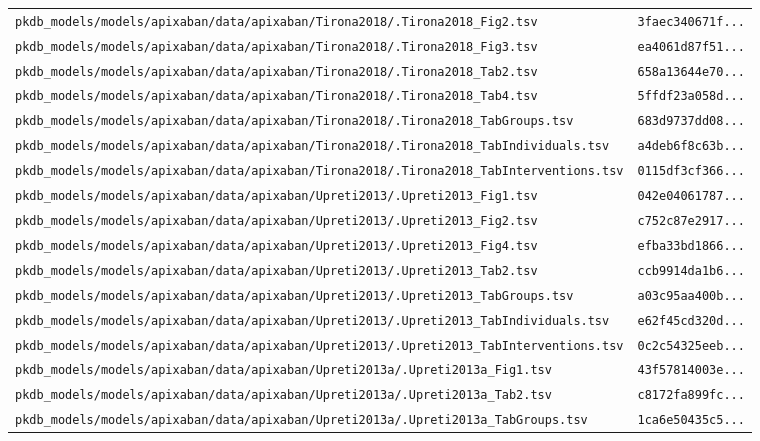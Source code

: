 \documentclass{article}
\begin{document}
\begin{longtable}{ll}
\texttt{pkdb\_models/models/apixaban/data/apixaban/Tirona2018/.Tirona2018\_Fig2.tsv} & \texttt{3faec340671f...} \\
\texttt{pkdb\_models/models/apixaban/data/apixaban/Tirona2018/.Tirona2018\_Fig3.tsv} & \texttt{ea4061d87f51...} \\
\texttt{pkdb\_models/models/apixaban/data/apixaban/Tirona2018/.Tirona2018\_Tab2.tsv} & \texttt{658a13644e70...} \\
\texttt{pkdb\_models/models/apixaban/data/apixaban/Tirona2018/.Tirona2018\_Tab4.tsv} & \texttt{5ffdf23a058d...} \\
\texttt{pkdb\_models/models/apixaban/data/apixaban/Tirona2018/.Tirona2018\_TabGroups.tsv} & \texttt{683d9737dd08...} \\
\texttt{pkdb\_models/models/apixaban/data/apixaban/Tirona2018/.Tirona2018\_TabIndividuals.tsv} & \texttt{a4deb6f8c63b...} \\
\texttt{pkdb\_models/models/apixaban/data/apixaban/Tirona2018/.Tirona2018\_TabInterventions.tsv} & \texttt{0115df3cf366...} \\
\texttt{pkdb\_models/models/apixaban/data/apixaban/Upreti2013/.Upreti2013\_Fig1.tsv} & \texttt{042e04061787...} \\
\texttt{pkdb\_models/models/apixaban/data/apixaban/Upreti2013/.Upreti2013\_Fig2.tsv} & \texttt{c752c87e2917...} \\
\texttt{pkdb\_models/models/apixaban/data/apixaban/Upreti2013/.Upreti2013\_Fig4.tsv} & \texttt{efba33bd1866...} \\
\texttt{pkdb\_models/models/apixaban/data/apixaban/Upreti2013/.Upreti2013\_Tab2.tsv} & \texttt{ccb9914da1b6...} \\
\texttt{pkdb\_models/models/apixaban/data/apixaban/Upreti2013/.Upreti2013\_TabGroups.tsv} & \texttt{a03c95aa400b...} \\
\texttt{pkdb\_models/models/apixaban/data/apixaban/Upreti2013/.Upreti2013\_TabIndividuals.tsv} & \texttt{e62f45cd320d...} \\
\texttt{pkdb\_models/models/apixaban/data/apixaban/Upreti2013/.Upreti2013\_TabInterventions.tsv} & \texttt{0c2c54325eeb...} \\
\texttt{pkdb\_models/models/apixaban/data/apixaban/Upreti2013a/.Upreti2013a\_Fig1.tsv} & \texttt{43f57814003e...} \\
\texttt{pkdb\_models/models/apixaban/data/apixaban/Upreti2013a/.Upreti2013a\_Tab2.tsv} & \texttt{c8172fa899fc...} \\
\texttt{pkdb\_models/models/apixaban/data/apixaban/Upreti2013a/.Upreti2013a\_TabGroups.tsv} & \texttt{1ca6e50435c5...} \\

\end{longtable}
\end{document}
